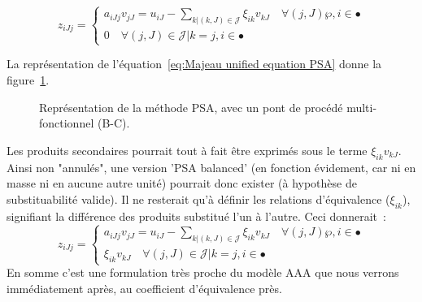 \begin{equation}
 \label{eq:Majeau unified equation PSA}
 z_{iJj}=
 \begin{cases} a_{iJj}v_{jJ} = u_{iJ} - \displaystyle\sum_{k|(k,J)\in\mathcal{J}} \xi_{ik}v_{kJ} \quad \forall(j,J)\wp,i\in \bullet 
 \\
 0 \quad \forall(j,J)\in \mathcal{J}|k = j,i\in \bullet
 \end{cases}
\end{equation}

La représentation de l'équation~\ref{eq:Majeau unified equation PSA} donne la figure~\ref{fig:PSA-FR}.
\begin{figure}[htbp]
\resizebox{1.00\textwidth}{!}{

}
\caption{Représentation de la méthode PSA, avec un pont de procédé multi-fonctionnel (B-C).}
\label{fig:PSA-FR}
\end{figure}

Les produits secondaires pourrait tout à fait être exprimés sous le terme $\xi_{ik}v_{kJ}$.
Ainsi non "annulés", une version 'PSA balanced' (en fonction évidement, car ni en masse ni en aucune autre unité) pourrait donc exister (à hypothèse de substituabilité valide).
Il ne resterait qu'à définir les relations d'équivalence ($\xi_{ik}$), signifiant la différence des produits substitué l'un à l'autre.
Ceci donnerait~:
\begin{equation}
 z_{iJj}=
 \begin{cases} a_{iJj}v_{jJ} = u_{iJ} - \displaystyle\sum_{k|(k,J)\in\mathcal{J}} \xi_{ik}v_{kJ} \quad \forall(j,J)\wp,i\in \bullet 
 \\
 \xi_{ik}v_{kJ} \quad \forall(j,J)\in \mathcal{J}|k = j,i\in \bullet
 \end{cases}
 \label{eq:PSA-Majeau_Balanced}
\end{equation}
En somme c'est une formulation très proche du modèle AAA que nous verrons immédiatement après, au coefficient d'équivalence près.
